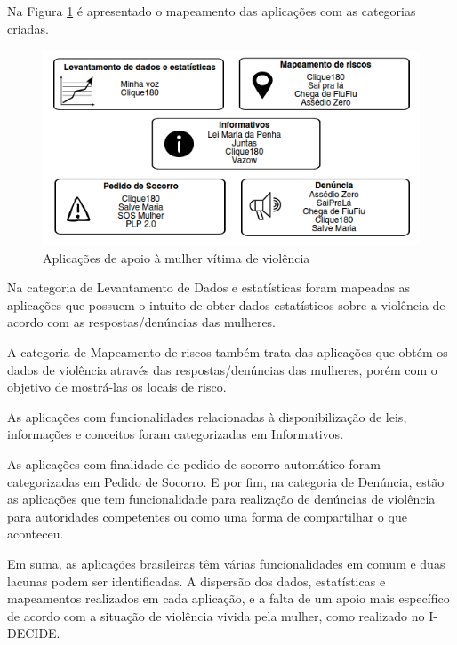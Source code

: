 Na Figura \ref{fig:sistemas_categorizados} é apresentado o mapeamento das aplicações com as categorias criadas.

\begin{figure}[h!]
\centering
\includegraphics[scale=0.75]{figuras/sistemas_relacionados.png}
\caption{Aplicações de apoio à mulher vítima de violência}
\label{fig:sistemas_categorizados}
\end{figure}

Na categoria de Levantamento de Dados e estatísticas foram mapeadas as aplicações que possuem
o intuito de obter dados estatísticos sobre a violência de acordo com as respostas/denúncias das mulheres.

A categoria de Mapeamento de riscos também trata das aplicações que obtém os dados de violência através
das respostas/denúncias das mulheres, porém com o objetivo de mostrá-las os locais de risco.

As aplicações com funcionalidades relacionadas à disponibilização de leis, informações e conceitos foram
categorizadas em Informativos.

As aplicações com finalidade de pedido de socorro automático foram categorizadas em Pedido de Socorro. E por fim, na categoria de Denúncia, estão as aplicações que tem funcionalidade para realização de denúncias de violência
para autoridades competentes ou como uma forma de compartilhar o que aconteceu.

Em suma, as aplicações brasileiras têm várias funcionalidades em comum e duas lacunas podem ser identificadas. 
A dispersão dos dados, estatísticas e mapeamentos realizados em cada aplicação, e a falta de um apoio mais específico de acordo com a situação de violência vivida pela mulher, como realizado no I-DECIDE.



\vfill